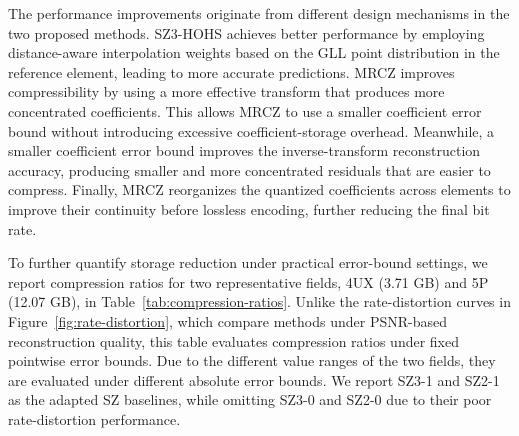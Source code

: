 The performance improvements originate from different design mechanisms in the two proposed methods.
SZ3-HOHS achieves better performance by employing distance-aware interpolation weights based on the GLL point distribution in the reference element, leading to more accurate predictions.
MRCZ improves compressibility by using a more effective transform that produces more concentrated coefficients. This allows MRCZ to use a smaller coefficient error bound without introducing excessive coefficient-storage overhead. Meanwhile, a smaller coefficient error bound improves the inverse-transform reconstruction accuracy, producing smaller and more concentrated residuals that are easier to compress. Finally, MRCZ reorganizes the quantized coefficients across elements to improve their continuity before lossless encoding, further reducing the final bit rate.


To further quantify storage reduction under practical error-bound settings, we report compression ratios for two representative fields, 4UX (3.71 GB) and 5P (12.07 GB), in Table~\ref{tab:compression-ratios}. Unlike the rate-distortion curves in Figure~\ref{fig:rate-distortion}, which compare methods under PSNR-based reconstruction quality, this table evaluates compression ratios under fixed pointwise error bounds. Due to the different value ranges of the two fields, they are evaluated under different absolute error bounds. We report SZ3-1 and SZ2-1 as the adapted SZ baselines, while omitting SZ3-0 and SZ2-0 due to their poor rate-distortion performance.


